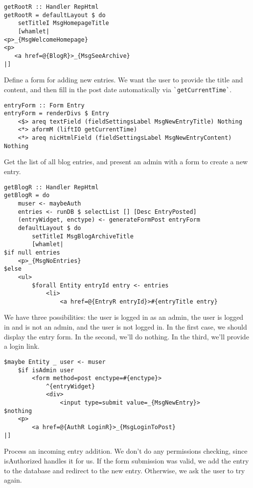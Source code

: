\begin{lstlisting}
getRootR :: Handler RepHtml
getRootR = defaultLayout $ do
    setTitleI MsgHomepageTitle
    [whamlet|
<p>_{MsgWelcomeHomepage}
<p>
   <a href=@{BlogR}>_{MsgSeeArchive}
|]
\end{lstlisting}

Define a form for adding new entries. We want the user to provide the title and content, and then fill in the post date automatically via \lstinline'`getCurrentTime`'.

\begin{lstlisting}
entryForm :: Form Entry
entryForm = renderDivs $ Entry
    <$> areq textField (fieldSettingsLabel MsgNewEntryTitle) Nothing
    <*> aformM (liftIO getCurrentTime)
    <*> areq nicHtmlField (fieldSettingsLabel MsgNewEntryContent) Nothing
\end{lstlisting}

Get the list of all blog entries, and present an admin with a form to create a new entry.

\begin{lstlisting}
getBlogR :: Handler RepHtml
getBlogR = do
    muser <- maybeAuth
    entries <- runDB $ selectList [] [Desc EntryPosted]
    (entryWidget, enctype) <- generateFormPost entryForm
    defaultLayout $ do
        setTitleI MsgBlogArchiveTitle
        [whamlet|
$if null entries
    <p>_{MsgNoEntries}
$else
    <ul>
        $forall Entity entryId entry <- entries
            <li>
                <a href=@{EntryR entryId}>#{entryTitle entry}
\end{lstlisting}

We have three possibilities: the user is logged in as an admin, the user is logged in and is not an admin, and the user is not logged in. In the first case, we should display the entry form. In the second, we'll do nothing. In the third, we'll provide a login link.

\begin{lstlisting}
$maybe Entity _ user <- muser
    $if isAdmin user
        <form method=post enctype=#{enctype}>
            ^{entryWidget}
            <div>
                <input type=submit value=_{MsgNewEntry}>
$nothing
    <p>
        <a href=@{AuthR LoginR}>_{MsgLoginToPost}
|]
\end{lstlisting}

Process an incoming entry addition. We don't do any permissions checking, since isAuthorized handles it for us. If the form submission was valid, we add the entry to the database and redirect to the new entry. Otherwise, we ask the user to try again.

